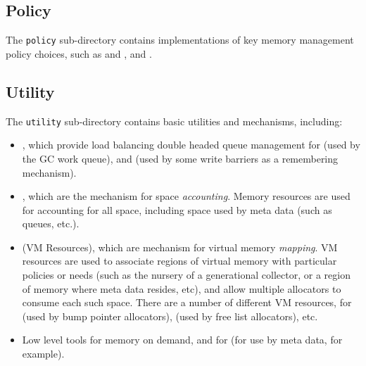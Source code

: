 \subsection{Policy} \label{sssec:policy}

The \texttt{policy} sub-directory contains implementations of key
memory management policy choices, such as  and ,  and .

\subsection{Utility} \label{sssec:utility}

The \texttt{utility} sub-directory contains basic utilities and
mechanisms, including:
\begin{itemize}
\item {}, which provide load balancing double
  headed queue management for  (used by the GC work queue), and
   (used by some write
  barriers as a remembering mechanism).
\item {}, which are the
  mechanism for space \emph{accounting}.  Memory resources are used
  for accounting for all space, including space used by meta data
  (such as queues, etc.).
\item {} (VM
  Resources), which are mechanism for virtual memory \emph{mapping}.
  VM resources are used to associate regions of virtual memory with
  particular policies or needs (such as the nursery of a generational
  collector, or a region of memory where meta data resides, etc), and
  allow multiple allocators to consume each such space. There are a
  number of different VM resources, for  (used by bump pointer
  allocators), 
  (used by free list allocators), etc.
\item Low level tools for 
  memory on demand, and for  (for use by meta data, for example).
\end{itemize}

